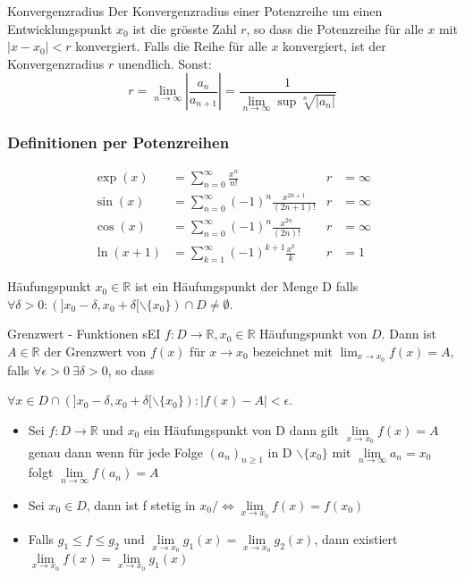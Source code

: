 \documentclass[a4paper,10pt]{article}
\def\limn{\lim\limits_{n\to \infty}}
\def\sumk{\sum\limits_{k=1}^{\infty}}
\def\sumn{\sum\limits_{n=0}^{\infty}}
\def\R{\mathbb{R}}
\begin{document}
\begin{mainbox}{Konvergenzradius}
 Der Konvergenzradius einer Potenzreihe um einen Entwicklungspunkt $x_0$ ist die grösste Zahl $r$, so dass die Potenzreihe für alle $x$ mit $|x - x_0| < r$ konvergiert. Falls die Reihe für alle $x$ konvergiert, ist der Konvergenzradius $r$ unendlich. Sonst:
 $$r = \limn \left| \frac{a_n}{a_{n+1}} \right| = \frac{1}{\limn\sup \sqrt[n]{|a_n|}} $$
\end{mainbox}

\subsubsection{Definitionen per Potenzreihen}

\begin{align*}
\exp(x) &= \sumn \frac{x^n}{n!} & r &= \infty \\
\sin(x) &= \sumn (-1)^n \frac{x^{2n + 1}}{(2n + 1)!} & r &= \infty \\
\cos(x) &= \sumn (-1)^n \frac{x^{2n}}{(2n)!} & r &= \infty \\
\ln(x + 1) &= \sumk (-1)^{k+1} \frac{x^k}{k} & r &= 1
\end{align*}

\begin{subbox}{Häufungspunkt}
 $x_0 \in \R$ ist ein Häufungspunkt der Menge D falls $\forall \delta > 0: (]x_0 - \delta, x_0 + \delta[ \backslash \{x_0\}) \cap D \ne \emptyset $.
\end{subbox}

\begin{mainbox}{Grenzwert - Funktionen}
 sEI $f: D \to \R, x_0 \in \R$ Häufungspunkt von $D$. Dann ist $A \in \R$ der Grenzwert von $f(x)$ für $x \to x_0$ bezeichnet mit $\lim_{x\to x_0} f(x) = A$, falls $\forall \epsilon > 0 \ \exists \delta > 0$, so dass \par
 $\forall x \in D \cap (]x_0 - \delta, x_0 + \delta[ \backslash \{x_0\}): |f(x) - A| < \epsilon$.
\end{mainbox}

\begin{itemize}
  \item Sei $f : D \to \R$ und $x_0$ ein Häufungspunkt von D dann gilt $\lim\limits_{x\to x_0} f(x) = A$ genau dann wenn für jede Folge $(a_n)_{n\geq 1}$ in D $\backslash \{x_0\}$ mit $\limn a_n = x_0$ folgt $\limn f(a_n) = A$
  \item Sei $x_0 \in D$, dann ist f stetig in $x_0 /\Leftrightarrow \lim\limits_{x\to x_0} f(x) = f(x_0)$
  \item Falls $g_1 \leq f \leq g_2$ und $\lim\limits_{x\to x_0} g_1(x) = \lim\limits_{x\to x_0} g_2(x)$, dann existiert $\lim\limits_{x\to x_0} f(x) = \lim\limits_{x\to x_0} g_1(x)$
\end{itemize}
\end{document}
